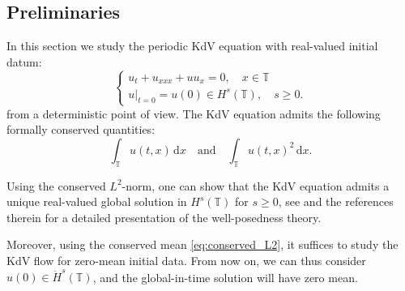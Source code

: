 \documentclass[a4paper,10pt,reqno]{article}
\theoremstyle{definition}
\theoremstyle{plain}
\theoremstyle{plain}
\theoremstyle{definition}
\theoremstyle{plain}
\theoremstyle{plain}
\theoremstyle{plain}
\theoremstyle{definition}
\theoremstyle{definition}
\def \T{\mathbb{T}}
\begin{document}
\subsection{Preliminaries} \label{subsection: preliminaries}

In this section we study the periodic 
KdV equation with real-valued initial datum: 
\begin{equation}\label{eq: kdv}
\begin{cases}
u_t + u_{xxx} + uu_x = 0, \quad x \in \T \\
u |_{t=0}= u(0) \in H^s(\T),  \quad s \ge 0.
\end{cases}
\end{equation}
from a deterministic point of view.
The KdV equation admits the following formally conserved quantities:
\begin{equation}\label{eq:conserved_L2}
\int_{\T} u(t,x) \, \mathrm{d}x \quad \mbox{and}\quad 
\int_{\T} u(t,x)^2 \, \mathrm{d}x.
\end{equation}

Using the conserved $L^2$-norm, one can show that the KdV equation admits a unique real-valued global solution in $H^s(\T)$ for $s \ge 0$,  see \cite[Chapter~3]{erdogan} and the references therein for a detailed presentation of the well-posedness theory.

Moreover, using the conserved mean \eqref{eq:conserved_L2}, it suffices to study the KdV flow for zero-mean initial data. From now on, we can thus consider $u(0) \in \dot{H}^s(\T)$, and the global-in-time solution will have zero mean.
\end{document}
